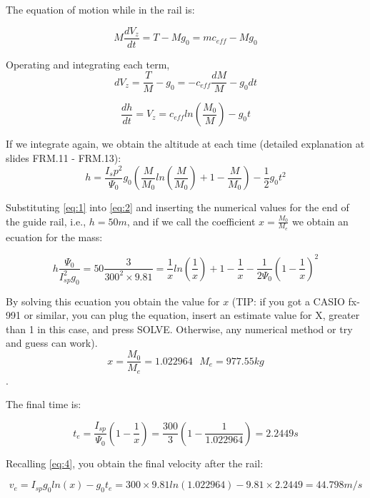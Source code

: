 The equation of motion while in the rail is: 

\begin{equation}
	M\frac{dV_z}{dt} = T - Mg_0 = mc_{eff} - Mg_0
\end{equation}

Operating and integrating each term, 
\begin{equation}
dV_z = \frac{T}{M} - g_0 = - c_{eff} \frac{dM}{M} - g_0 dt
\end{equation}

\begin{equation}
\frac{dh}{dt} = V_z =  c_{eff} ln(\frac{M_0}{M}) - g_0 t
\label{eq:4}
\end{equation}

If we integrate again, we obtain the altitude at each time (detailed explanation at slides FRM.11 - FRM.13):
\begin{equation}
h= \frac{I_sp^2}{\Psi_0} g_0 \left( \frac{M}{M_0}ln(\frac{M}{M_0}) + 1 - \frac{M}{M_0} \right) - \frac{1}{2}g_0 t^2 
\label{eq:2}
\end{equation}

Substituting \autoref{eq:1} into \autoref{eq:2} and inserting the numerical values for the end of the guide rail, i.e., $h=50m$, and if we call the coefficient $ x = \frac{M_0}{M_e} $  we obtain an ecuation for the mass:

\begin{equation}
h \frac{\Psi_0}{I_{sp}^2g_0}=50 \frac{3}{300^2\times 9.81} = \frac{1}{x}ln(\frac{1}{x}) + 1 - \frac{1}{x} - \frac{1}{2\Psi_0}\left(1-\frac{1}{x}\right)^2
\label{eq:3}
\end{equation}

By solving this ecuation you obtain the value for $x$ (TIP: if you got a CASIO fx-991 or similar, you can plug the equation, insert an estimate value for X, greater than 1 in this case, and press SOLVE. Otherwise, any numerical method or try and guess can work). 
$$x = \frac{M_0}{M_e} = 1.022964 \ \ \ M_e = 977.55 kg$$. 

The final time is: 

\begin{equation}
	t_e = \frac{I_{sp}}{\Psi_0}\left(1-\frac{1}{x}\right) = \frac{300}{3}\left(1-\frac{1}{ 1.022964}\right) =2.2449 s 
\end{equation}

Recalling \autoref{eq:4}, you obtain the final velocity after the rail: 

\begin{equation}
	v_e = I_{sp}g_0 ln(x) -g_0 t_e = 300\times 9.81 ln(1.022964) - 9.81\times 2.2449 = 44.798 m/s
\end{equation}

